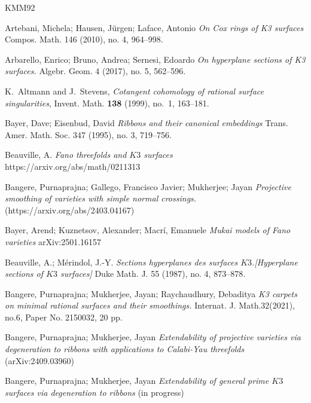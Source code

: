 \documentclass[11pt,twoside]{amsart}
\theoremstyle{plain}
\numberwithin{equation}{section}
\theoremstyle{definition}
\begin{document}

\begin{thebibliography}{KMM92}
\color{black}



Artebani, Michela; Hausen, Jürgen; Laface, Antonio
\emph{On Cox rings of K3 surfaces}
Compos. Math. 146 (2010), no. 4, 964–998.

Arbarello, Enrico; Bruno, Andrea; Sernesi, Edoardo
\emph{On hyperplane sections of K3 surfaces.}
Algebr. Geom. 4 (2017), no. 5, 562–596.


K.~Altmann and J.~Stevens,
\newblock \emph{Cotangent cohomology of rational surface singularities},
\newblock Invent. Math. \textbf{138} (1999), no.~1, 163--181.

Bayer, Dave; Eisenbud, David
\emph{Ribbons and their canonical embeddings}
Trans. Amer. Math. Soc. 347 (1995), no. 3, 719–756.


Beauville, A. \emph{Fano threefolds and $K3$ surfaces}
https://arxiv.org/abs/math/0211313

 Bangere, Purnaprajna; Gallego, Francisco Javier; Mukherjee; Jayan \emph{Projective smoothing of varieties with simple normal crossings.}(https://arxiv.org/abs/2403.04167)

Bayer, Arend;  Kuznetsov, Alexander;  Macr\'i, Emanuele 
\emph{Mukai models of Fano varieties}
arXiv:2501.16157

Beauville, A.; Mérindol, J.-Y.
\emph{Sections hyperplanes des surfaces $K3$.[Hyperplane sections of $K3$ surfaces]}
Duke Math. J. 55 (1987), no. 4, 873–878.

Bangere, Purnaprajna; Mukherjee, Jayan; Raychaudhury, Debaditya
\emph{K3 carpets on minimal rational surfaces and their smoothings.}
Internat. J. Math.32(2021), no.6, Paper No. 2150032, 20 pp.

Bangere, Purnaprajna; Mukherjee, Jayan  
\emph{Extendability of projective varieties via degeneration to ribbons with applications to Calabi-Yau threefolds} (arXiv:2409.03960)

Bangere, Purnaprajna; Mukherjee, Jayan  
\emph{Extendability of general prime $K3$ surfaces via degeneration to ribbons} (in progress)




\end{thebibliography}
\end{document}

